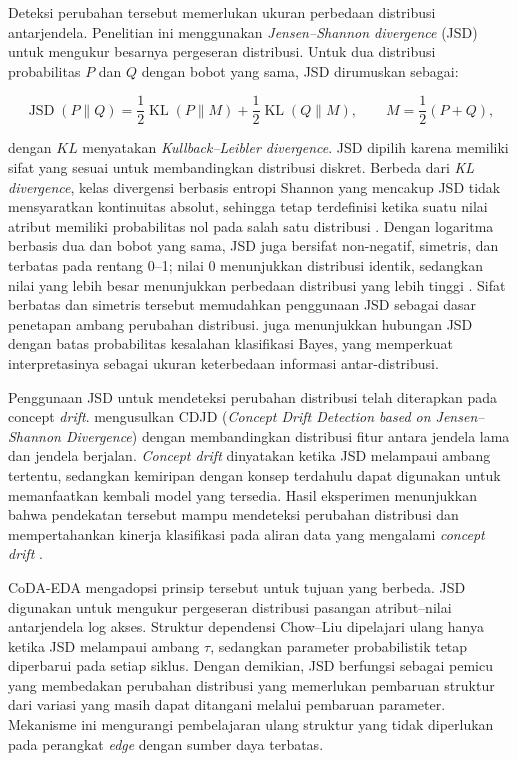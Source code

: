 Deteksi perubahan tersebut memerlukan ukuran perbedaan distribusi antarjendela. 
Penelitian ini menggunakan \textit{Jensen–Shannon divergence} (JSD)\label{first:jsd} untuk mengukur besarnya pergeseran distribusi. 
Untuk dua distribusi probabilitas $P$ dan $Q$ dengan bobot yang sama, JSD dirumuskan sebagai:

\begin{equation}
    \operatorname{JSD}(P \parallel Q)
    =
    \frac{1}{2}
    \operatorname{KL}(P \parallel M)
    +
    \frac{1}{2}
    \operatorname{KL}(Q \parallel M),
    \qquad
    M = \frac{1}{2}(P+Q),
    \label{eq:jsd-drift}
\end{equation}

dengan $KL$ menyatakan \textit{Kullback–Leibler divergence}. 
JSD dipilih karena memiliki sifat yang sesuai untuk membandingkan distribusi diskret. 
Berbeda dari \textit{KL divergence}, kelas divergensi berbasis entropi Shannon yang mencakup JSD tidak mensyaratkan kontinuitas absolut, sehingga tetap terdefinisi ketika suatu nilai atribut memiliki probabilitas nol pada salah satu distribusi \parencite{lin1991divergence}. 
Dengan logaritma berbasis dua dan bobot yang sama, JSD juga bersifat non-negatif, simetris, dan terbatas pada rentang 0–1; nilai 0 menunjukkan distribusi identik, sedangkan nilai yang lebih besar menunjukkan perbedaan distribusi yang lebih tinggi \parencite{lin1991divergence}. 
Sifat berbatas dan simetris tersebut memudahkan penggunaan JSD sebagai dasar penetapan ambang perubahan distribusi. 
\textcite{lin1991divergence} juga menunjukkan hubungan JSD dengan batas probabilitas kesalahan klasifikasi Bayes, yang memperkuat interpretasinya sebagai ukuran keterbedaan informasi antar-distribusi.

Penggunaan JSD untuk mendeteksi perubahan distribusi telah diterapkan pada concept \textit{drift}. 
\textcite{yang2022concept} mengusulkan CDJD (\textit{Concept Drift Detection based on Jensen–Shannon Divergence}) dengan membandingkan distribusi fitur antara jendela lama dan jendela berjalan. 
\textit{Concept drift} dinyatakan ketika JSD melampaui ambang tertentu, sedangkan kemiripan dengan konsep terdahulu dapat digunakan untuk memanfaatkan kembali model yang tersedia. 
Hasil eksperimen menunjukkan bahwa pendekatan tersebut mampu mendeteksi perubahan distribusi dan mempertahankan kinerja klasifikasi pada aliran data yang mengalami \textit{concept drift} \parencite{yang2022concept}.

CoDA-EDA mengadopsi prinsip tersebut untuk tujuan yang berbeda. 
JSD digunakan untuk mengukur pergeseran distribusi pasangan atribut–nilai antarjendela log akses. 
Struktur dependensi Chow–Liu dipelajari ulang hanya ketika JSD melampaui ambang $\tau$\label{first:symbol-tau}, sedangkan parameter probabilistik tetap diperbarui pada setiap siklus. 
Dengan demikian, JSD berfungsi sebagai pemicu yang membedakan perubahan distribusi yang memerlukan pembaruan struktur dari variasi yang masih dapat ditangani melalui pembaruan parameter. 
Mekanisme ini mengurangi pembelajaran ulang struktur yang tidak diperlukan pada perangkat \textit{edge} dengan sumber daya terbatas.

